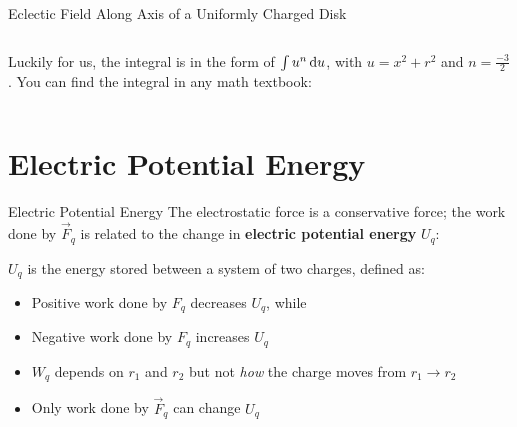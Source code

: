 \documentclass[12pt,aspectratio=169]{beamer}
\begin{document}
\begin{frame}{Eclectic Field Along Axis of a Uniformly Charged Disk}
  \begin{columns}
    
    Luckily for us, the integral is in the form of $\int u^n\dl u$,
    with $u=x^2+r^2$ and $n=\frac{-3}2$. You can find the integral in any math
    textbook:

  \end{columns}
\end{frame}



\section{Electric Potential Energy}

\begin{frame}{Electric Potential Energy}
  The electrostatic force is a conservative force; the work done by $\vec F_q$
  is related to the change in \textbf{electric potential energy} $U_q$:
  

  $U_q$ is the energy stored between a system of two charges, defined as:
    
  \begin{itemize}
  \item Positive work done by $F_q$ decreases $U_q$, while
  \item Negative work done by $F_q$ increases $U_q$
  \item $W_q$ depends on $r_1$ and $r_2$ but not \emph{how} the charge moves
    from $r_1\rightarrow r_2$
  \item Only work done by $\vec F_q$ can change $U_q$
  \end{itemize}
\end{frame}
\end{document}
